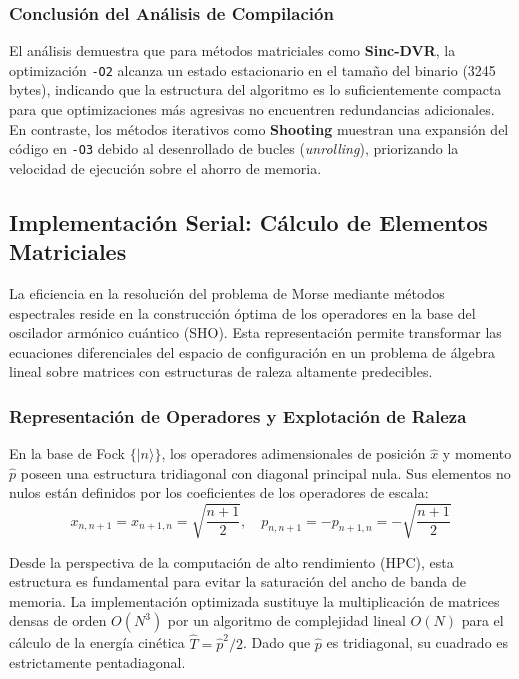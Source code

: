 \documentclass[11pt,fleqn]{article}
\begin{document}
\subsubsection{Conclusión del Análisis de Compilación}

El análisis demuestra que para métodos matriciales como \textbf{Sinc-DVR}, la optimización \texttt{-O2} alcanza un estado estacionario en el tamaño del binario (3245 bytes), indicando que la estructura del algoritmo es lo suficientemente compacta para que optimizaciones más agresivas no encuentren redundancias adicionales. En contraste, los métodos iterativos como \textbf{Shooting} muestran una expansión del código en \texttt{-O3} debido al desenrollado de bucles (\textit{unrolling}), priorizando la velocidad de ejecución sobre el ahorro de memoria.

\subsection{Implementación Serial: Cálculo de Elementos Matriciales}

La eficiencia en la resolución del problema de Morse mediante métodos espectrales reside en la construcción óptima de los operadores en la base del oscilador armónico cuántico (SHO). Esta representación permite transformar las ecuaciones diferenciales del espacio de configuración en un problema de álgebra lineal sobre matrices con estructuras de raleza altamente predecibles.

\subsubsection{Representación de Operadores y Explotación de Raleza}
En la base de Fock $\{|n\rangle\}$, los operadores adimensionales de posición $\hat{x}$ y momento $\hat{p}$ poseen una estructura tridiagonal con diagonal principal nula. Sus elementos no nulos están definidos por los coeficientes de los operadores de escala:
\begin{equation}
x_{n, n+1} = x_{n+1, n} = \sqrt{\frac{n+1}{2}}, \quad p_{n, n+1} = -p_{n+1, n} = -\sqrt{\frac{n+1}{2}}
\end{equation}

Desde la perspectiva de la computación de alto rendimiento (HPC), esta estructura es fundamental para evitar la saturación del ancho de banda de memoria. La implementación optimizada sustituye la multiplicación de matrices densas de orden $O(N^3)$ por un algoritmo de complejidad lineal $O(N)$ para el cálculo de la energía cinética $\hat{T} = \hat{p}^2/2$. Dado que $\hat{p}$ es tridiagonal, su cuadrado es estrictamente pentadiagonal. 
\end{document}
